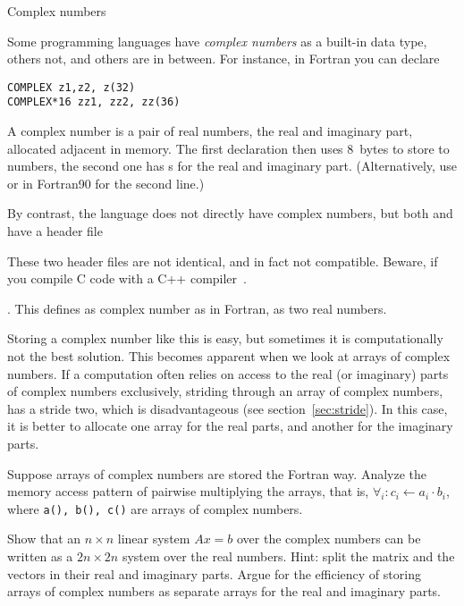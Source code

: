  {Complex numbers}
\label{sec:complex}

Some programming languages have \emph{complex numbers} as a built-in data type,
others not, and others are in between. For instance, in Fortran you
can declare
\begin{verbatim}
COMPLEX z1,z2, z(32)
COMPLEX*16 zz1, zz2, zz(36)
\end{verbatim}
A complex number is a pair of real numbers, the real and imaginary
part, allocated adjacent in memory. The first declaration then uses
8~bytes to store to  numbers, the second one has s
for the real and imaginary part.  (Alternatively, use  or in Fortran90  for the second line.)

By contrast, the  language does not directly have complex
numbers, but both  and  have a  header
file
\begin{footnoteenv}
  {These two header files are not identical, and in fact
  not compatible. Beware, if you compile C code with a C++
  compiler~\cite{DobbsComplex}.}
\end{footnoteenv}
. This defines as complex number as in
Fortran, as two real numbers.

Storing a complex number like this is easy, but sometimes it is
computationally not the best solution. This becomes apparent when we
look at arrays of complex numbers.
If a computation often relies
on access to the real (or imaginary) parts of complex numbers
exclusively, striding through an array of complex numbers, has a
stride two, which is disadvantageous (see
section~\ref{sec:stride}). In this case, it is better to allocate one
array for the real parts, and another for the imaginary parts.

\begin{exercise}
  Suppose arrays of complex numbers are stored the Fortran
  way. Analyze the memory access pattern of pairwise multiplying the
  arrays, that is, $\forall_i\colon c_i\leftarrow a_i\cdot b_i$, where
  \texttt{a(), b(), c()} are arrays of complex numbers.
\end{exercise}

\begin{exercise}
  Show that an $n\times n$ linear system $Ax=b$ over the complex numbers
  can be written as a $2n\times 2n$ system over the real
  numbers. Hint: split the matrix and the vectors in their real and
  imaginary parts. Argue for the efficiency of storing arrays of
  complex numbers as separate arrays for the real and imaginary parts.
\end{exercise}

